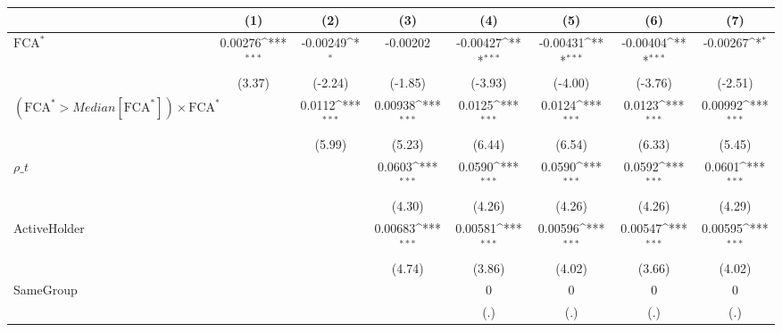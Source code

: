 {
\def\sym#1{\ifmmode^{#1}\else\(^{#1}\)\fi}
\begin{tabular}{l*{7}{c}}
\hline\hline
                    &\multicolumn{1}{c}{(1)}         &\multicolumn{1}{c}{(2)}         &\multicolumn{1}{c}{(3)}         &\multicolumn{1}{c}{(4)}         &\multicolumn{1}{c}{(5)}         &\multicolumn{1}{c}{(6)}         &\multicolumn{1}{c}{(7)}         \\
\hline
$ \text{FCA}^* $    &     0.00276\sym{***}&    -0.00249\sym{*}  &    -0.00202         &    -0.00427\sym{***}&    -0.00431\sym{***}&    -0.00404\sym{***}&    -0.00267\sym{*}  \\
                    &      (3.37)         &     (-2.24)         &     (-1.85)         &     (-3.93)         &     (-4.00)         &     (-3.76)         &     (-2.51)         \\
[1em]
 $ (\text{FCA}^* > Median[\text{FCA}^*]) \times {\text{FCA} ^*}  $ &                     &      0.0112\sym{***}&     0.00938\sym{***}&      0.0125\sym{***}&      0.0124\sym{***}&      0.0123\sym{***}&     0.00992\sym{***}\\
                    &                     &      (5.99)         &      (5.23)         &      (6.44)         &      (6.54)         &      (6.33)         &      (5.45)         \\
[1em]
$ \rho\_t $          &                     &                     &      0.0603\sym{***}&      0.0590\sym{***}&      0.0590\sym{***}&      0.0592\sym{***}&      0.0601\sym{***}\\
                    &                     &                     &      (4.30)         &      (4.26)         &      (4.26)         &      (4.26)         &      (4.29)         \\
[1em]
ActiveHolder        &                     &                     &     0.00683\sym{***}&     0.00581\sym{***}&     0.00596\sym{***}&     0.00547\sym{***}&     0.00595\sym{***}\\
                    &                     &                     &      (4.74)         &      (3.86)         &      (4.02)         &      (3.66)         &      (4.02)         \\
[1em]
SameGroup           &                     &                     &                     &           0         &           0         &           0         &           0         \\
                    &                     &                     &                     &         (.)         &         (.)         &         (.)         &         (.)         \\

\end{tabular}}
